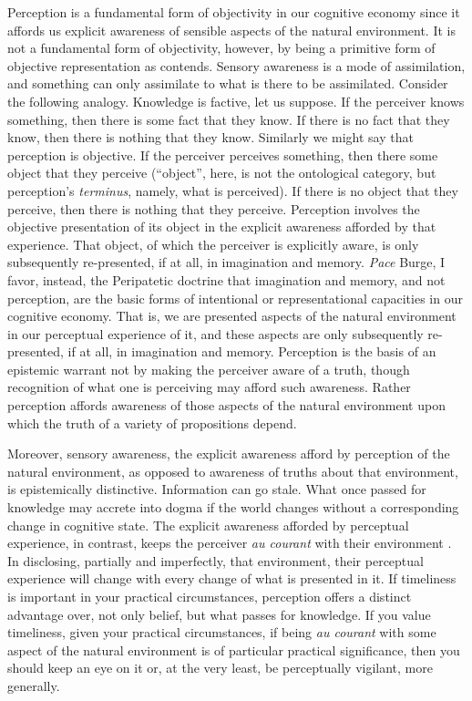 Perception is a fundamental form of objectivity in our cognitive economy since it affords us explicit awareness of sensible aspects of the natural environment. It is not a fundamental form of objectivity, however, by being a primitive form of objective representation as \cite{Burge:2010uq} contends. Sensory awareness is a mode of assimilation, and something can only assimilate to what is there to be assimilated. Consider the following analogy. Knowledge is factive, let us suppose. If the perceiver knows something, then there is some fact that they know. If there is no fact that they know, then there is nothing that they know. Similarly we might say that perception is objective. If the perceiver perceives something, then there some object that they perceive (``object'', here, is not the ontological category, but perception's \emph{terminus}, namely, what is perceived). If there is no object that they perceive, then there is nothing that they perceive. Perception involves the objective presentation of its object in the explicit awareness afforded by that experience. That object, of which the perceiver is explicitly aware, is only subsequently re-presented, if at all, in imagination and memory. \emph{Pace} Burge, I favor, instead, the Peripatetic doctrine that imagination and memory, and not perception, are the basic forms of intentional or representational capacities in our cognitive economy. That is, we are presented aspects of the natural environment in our perceptual experience of it, and these aspects are only subsequently re-presented, if at all, in imagination and memory. Perception is the basis of an epistemic warrant not by making the perceiver aware of a truth, though recognition of what one is perceiving may afford such awareness. Rather perception affords awareness of those aspects of the natural environment upon which the truth of a variety of propositions depend.

Moreover, sensory awareness, the explicit awareness afford by perception of the natural environment, as opposed to awareness of truths about that environment, is epistemically distinctive. Information can go stale. What once passed for knowledge may accrete into dogma if the world changes without a corresponding change in cognitive state. The explicit awareness afforded by perceptual experience, in contrast, keeps the perceiver \emph{au courant} with their environment \citep[173--174]{Travis:2013tk}. In disclosing, partially and imperfectly, that environment, their perceptual experience will change with every change of what is presented in it. If timeliness is important in your practical circumstances, perception offers a distinct advantage over, not only belief, but what passes for knowledge. If you value timeliness, given your practical circumstances, if being \emph{au courant} with some aspect of the natural environment is of particular practical significance, then you should keep an eye on it or, at the very least, be perceptually vigilant, more generally.

